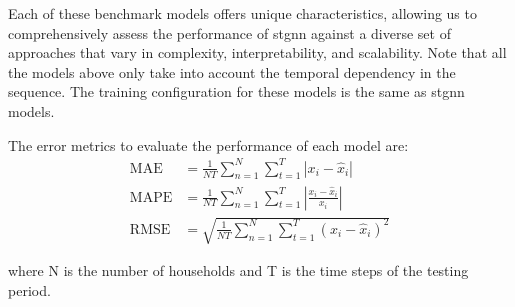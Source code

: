 Each of these benchmark models offers unique characteristics, allowing us to comprehensively assess the performance of \acrshort{stgnn} against a diverse set of approaches that vary in complexity, interpretability, and scalability. Note that all the models above only take into account the temporal dependency in the sequence. The training configuration for these models is the same as \acrshort{stgnn} models.

The error metrics to evaluate the performance of each model are:
\begin{align}
    \text{MAE} &= \frac{1}{NT}\sum_{n=1}^N\sum_{t=1}^T|x_i - \hat{x}_i| \\
    \text{MAPE} &= \frac{1}{NT}\sum_{n=1}^N\sum_{t=1}^T \left|\frac{x_i - \hat{x}_i}{x_i}\right| \\
    \text{RMSE} &= \sqrt{\frac{1}{NT}\sum_{n=1}^N\sum_{t=1}^T\left(x_i - \hat{x}_i\right)^2}
\end{align}

where N is the number of households and T is the time steps of the testing period.



